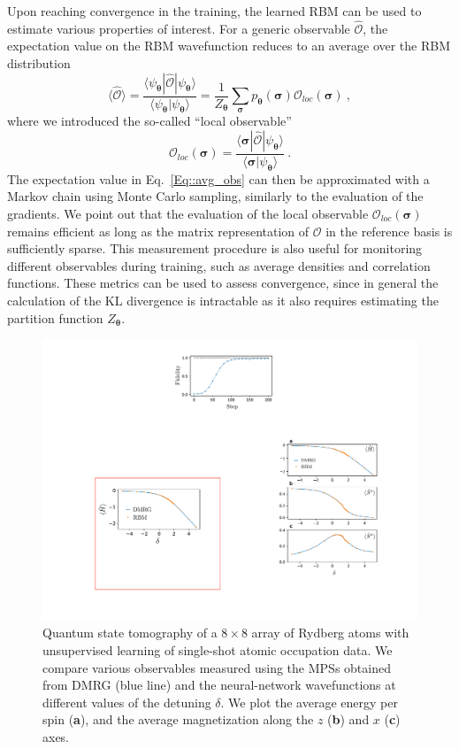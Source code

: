 \documentclass[twocolumn,english,reprint,superscriptaddress,longbibliography,pra]{revtex4-1}
\begin{document}
Upon reaching convergence in the training, the learned RBM can be used to estimate various properties of interest. For a generic observable $\hat{\mathcal{O}}$, the expectation value on the RBM wavefunction reduces to an average over the RBM distribution
\begin{equation}
\langle\hat{\mathcal{O}}\rangle = \frac{\langle\psi_{\bm\theta}|\hat{\mathcal{O}}|\psi_{\bm\theta}\rangle}{\langle\psi_{\bm\theta}|\psi_{\bm\theta}\rangle} =
\frac{1}{Z_{\bm\theta}}\sum_{\bm{\sigma}}p_{\bm\theta}(\bm\sigma)\mathcal{O}_{loc}(\bm\sigma)\:,
\label{Eq::avg_obs}
\end{equation}
where we introduced the so-called ``local observable''
\begin{equation}
\mathcal{O}_{loc}(\bm\sigma) = \frac{\langle\bm\sigma|\hat{\mathcal{O}}|\psi_{\bm\theta}\rangle}{\langle\bm\sigma|\psi_{\bm\theta}\rangle}\:.
\end{equation}
The expectation value in Eq.~\ref{Eq::avg_obs} can then be approximated with a Markov chain using Monte Carlo sampling, similarly to the evaluation of the gradients. We point out that the evaluation of the local observable $\mathcal{O}_{loc}(\bm\sigma)$ remains efficient as long as the matrix representation of $\mathcal{O}$ in the reference basis is sufficiently sparse. This measurement procedure is also useful for monitoring different observables during training, such as average densities and correlation functions. These metrics can be used to assess convergence, since in general the calculation of the KL divergence is intractable as it also requires estimating the partition function $Z_{\bm\theta}$.

\begin{figure}[t]
\noindent \centering{}\includegraphics[width=\columnwidth]{fig_qst_rydberg}
\caption{Quantum state tomography of a $8\times8$ array of Rydberg atoms with unsupervised learning of single-shot atomic occupation data. We compare various observables measured using the MPSs obtained from DMRG (blue line) and the neural-network wavefunctions at different values of the detuning $\delta$. We plot the average energy per spin ({\bf a}), and the average magnetization along the $z$ ({\bf b}) and $x$ ({\bf c}) axes.}
\label{Fig::QST_rydberg} 
\end{figure}
\end{document}
